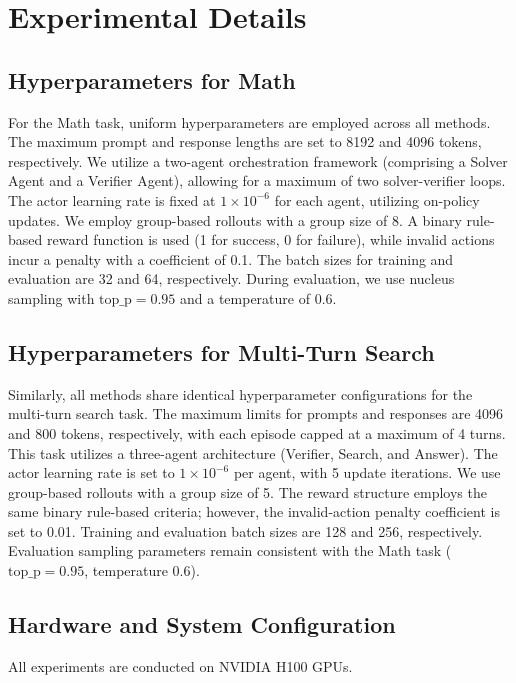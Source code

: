 \section{Experimental Details}
\label{app:experimental_details}

\subsection{Hyperparameters for Math}
\label{app:experimental_details_math}
For the Math task, uniform hyperparameters are employed across all methods. The maximum prompt and response lengths are set to 8192 and 4096 tokens, respectively. We utilize a two-agent orchestration framework (comprising a Solver Agent and a Verifier Agent), allowing for a maximum of two solver-verifier loops. The actor learning rate is fixed at $1 \times 10^{-6}$ for each agent, utilizing on-policy updates. We employ group-based rollouts with a group size of 8. A binary rule-based reward function is used (1 for success, 0 for failure), while invalid actions incur a penalty with a coefficient of 0.1. The batch sizes for training and evaluation are 32 and 64, respectively. During evaluation, we use nucleus sampling with $\text{top\_p}=0.95$ and a temperature of 0.6.

\subsection{Hyperparameters for Multi-Turn Search}
\label{app:experimental_details_search}
Similarly, all methods share identical hyperparameter configurations for the multi-turn search task. The maximum limits for prompts and responses are 4096 and 800 tokens, respectively, with each episode capped at a maximum of 4 turns. This task utilizes a three-agent architecture (Verifier, Search, and Answer). The actor learning rate is set to $1 \times 10^{-6}$ per agent, with 5 update iterations. We use group-based rollouts with a group size of 5. The reward structure employs the same binary rule-based criteria; however, the invalid-action penalty coefficient is set to 0.01. Training and evaluation batch sizes are 128 and 256, respectively. Evaluation sampling parameters remain consistent with the Math task ($\text{top\_p}=0.95$, temperature 0.6).

\subsection{Hardware and System Configuration}
All experiments are conducted on NVIDIA H100 GPUs. 

